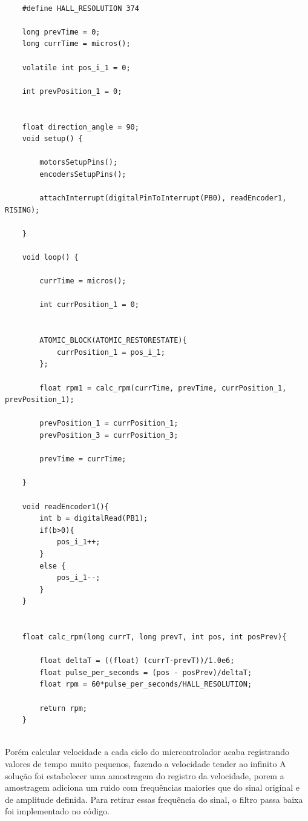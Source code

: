 	\lstset{language=C}
	\begin{lstlisting}
	
	#define HALL_RESOLUTION 374
	
	long prevTime = 0;
	long currTime = micros();
	
	volatile int pos_i_1 = 0;
	
	int prevPosition_1 = 0;
	
	
	float direction_angle = 90;
	void setup() {
	
		motorsSetupPins();
		encodersSetupPins();
	
		attachInterrupt(digitalPinToInterrupt(PB0), readEncoder1, RISING);
		
	}
	
	void loop() {
	
		currTime = micros();
	
		int currPosition_1 = 0;
	
	
		ATOMIC_BLOCK(ATOMIC_RESTORESTATE){
			currPosition_1 = pos_i_1;
		};
		
		float rpm1 = calc_rpm(currTime, prevTime, currPosition_1, prevPosition_1);
	
		prevPosition_1 = currPosition_1;
		prevPosition_3 = currPosition_3;
	
		prevTime = currTime;  
	
	}
	
	void readEncoder1(){ 
		int b = digitalRead(PB1);
		if(b>0){
			pos_i_1++;
		}
		else {
			pos_i_1--;
		}
	}
	
	
	float calc_rpm(long currT, long prevT, int pos, int posPrev){
	
		float deltaT = ((float) (currT-prevT))/1.0e6;
		float pulse_per_seconds = (pos - posPrev)/deltaT;
		float rpm = 60*pulse_per_seconds/HALL_RESOLUTION;
	
		return rpm;
	}
	
	\end{lstlisting}
	
	
	Porém calcular velocidade a cada ciclo do micrcontrolador acaba registrando valores de tempo muito pequenos, fazendo a velocidade tender ao infinito
	A solução foi estabelecer uma amostragem do registro da velocidade, porem a amostragem adiciona um ruido com frequências maiories que do sinal original e de amplitude definida.
	Para retirar essas frequência do sinal, o filtro passa baixa foi implementado no código.
	
